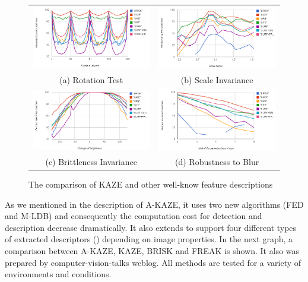 \begin{figure}[H]
\begin{tabular}{cc}
  \includegraphics[width=75mm]{figures/rotation_KAZE} &  \includegraphics[width=75mm]{figures/scale_KAZE} \\
(a) Rotation Test & (b) Scale Invariance \\[6pt]
 \includegraphics[width=75mm]{figures/brightness_KAZE} &  \includegraphics[width=75mm]{figures/blur_KAZE} \\
(c) Brittleness Invariance & (d) Robustness to Blur \\[6pt]
\end{tabular}
\caption{The comparison of KAZE and other well-know feature descriptions}\label{fig:compare_kaze}
\end{figure}

As we mentioned in the description of A-KAZE, it uses two new algorithms (FED and M-LDB) and consequently the computation cost for detection and description decrease dramatically. It also extends to support four different types of extracted descriptors () depending on image properties. In the next graph, a comparison between A-KAZE, KAZE, BRISK and FREAK is shown. It also was prepared by computer-vision-talks weblog. All methods are tested for a variety of environments and conditions.

